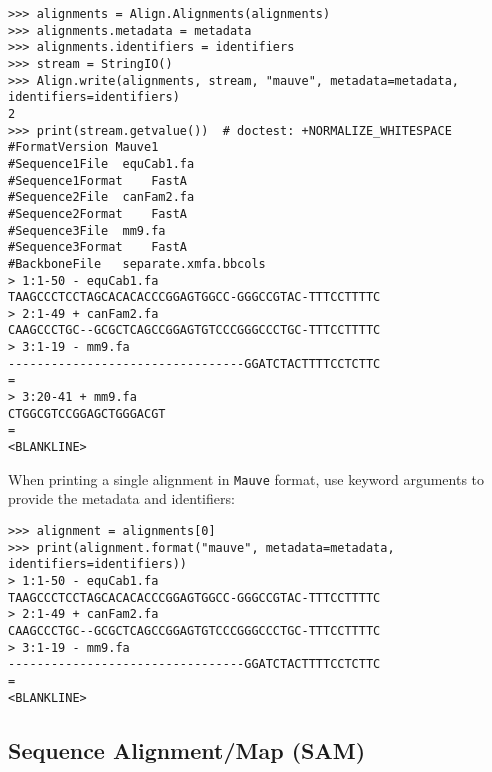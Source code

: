 \begin{verbatim}
>>> alignments = Align.Alignments(alignments)
>>> alignments.metadata = metadata
>>> alignments.identifiers = identifiers
>>> stream = StringIO()
>>> Align.write(alignments, stream, "mauve", metadata=metadata, identifiers=identifiers)
2
>>> print(stream.getvalue())  # doctest: +NORMALIZE_WHITESPACE
#FormatVersion Mauve1
#Sequence1File	equCab1.fa
#Sequence1Format	FastA
#Sequence2File	canFam2.fa
#Sequence2Format	FastA
#Sequence3File	mm9.fa
#Sequence3Format	FastA
#BackboneFile	separate.xmfa.bbcols
> 1:1-50 - equCab1.fa
TAAGCCCTCCTAGCACACACCCGGAGTGGCC-GGGCCGTAC-TTTCCTTTTC
> 2:1-49 + canFam2.fa
CAAGCCCTGC--GCGCTCAGCCGGAGTGTCCCGGGCCCTGC-TTTCCTTTTC
> 3:1-19 - mm9.fa
---------------------------------GGATCTACTTTTCCTCTTC
=
> 3:20-41 + mm9.fa
CTGGCGTCCGGAGCTGGGACGT
=
<BLANKLINE>
\end{verbatim}
When printing a single alignment in \verb+Mauve+ format, use keyword arguments to provide the metadata and identifiers:
\begin{verbatim}
>>> alignment = alignments[0]
>>> print(alignment.format("mauve", metadata=metadata, identifiers=identifiers))
> 1:1-50 - equCab1.fa
TAAGCCCTCCTAGCACACACCCGGAGTGGCC-GGGCCGTAC-TTTCCTTTTC
> 2:1-49 + canFam2.fa
CAAGCCCTGC--GCGCTCAGCCGGAGTGTCCCGGGCCCTGC-TTTCCTTTTC
> 3:1-19 - mm9.fa
---------------------------------GGATCTACTTTTCCTCTTC
=
<BLANKLINE>
\end{verbatim}

\subsection{Sequence Alignment/Map (SAM)}
\label{subsec:align_sam}

